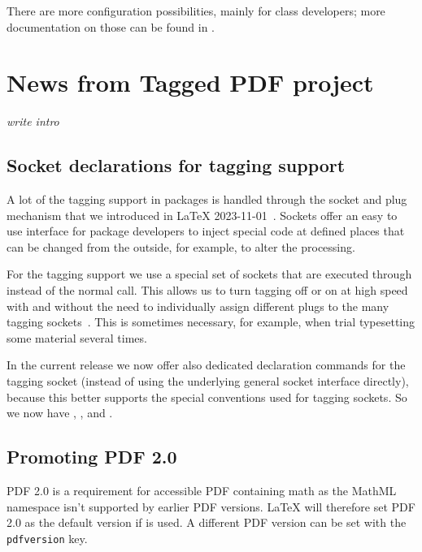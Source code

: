 \documentclass{ltnews}
\begin{document}
There are more configuration possibilities, mainly for class
developers; more documentation on those can be found in
\cite[\S54 ltoutput.dtx]{41:source2e}.



\section{News from Tagged PDF project}

\emph{write intro}


\subsection{Socket declarations for tagging  support}

A lot of the tagging support in packages is handled through the socket
and plug mechanism that we introduced in \LaTeX{}
2023-11-01~\cite{41:ltnews38}. Sockets offer an easy to use interface
for package developers to inject special code at defined places that
can be changed from the outside, for example, to alter the processing.

For the tagging support we use a special set of sockets that are
executed through  instead of the normal
 call. This allows us to turn tagging off or on at high
speed with  and  without the need
to individually assign different plugs to the many tagging
sockets~\cite{41:ltnews39}. This is sometimes necessary, for example,
when trial typesetting some material several times.

In the current release we now offer also dedicated declaration
commands for the tagging socket (instead of using the underlying
general socket interface directly), because this better supports the
special conventions used for tagging sockets. So we now have
, , and
.


\subsection{Promoting PDF 2.0}

PDF 2.0 is a requirement for accessible PDF containing math as the
MathML namespace isn't supported by earlier PDF versions. \LaTeX{}
will therefore set PDF 2.0 as the default version if
 is used. A different PDF version can be set with
the \texttt{pdfversion} key.
\end{document}
